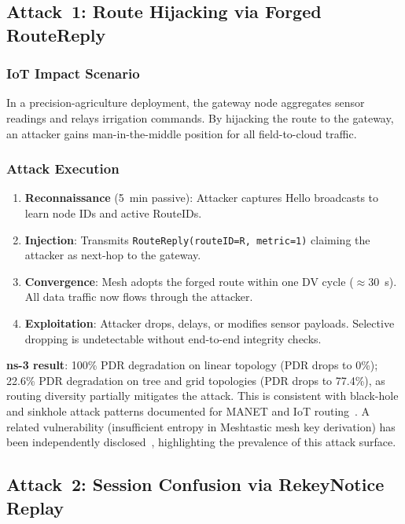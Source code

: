 \documentclass[10pt,journal,compsoc]{IEEEtran}
\begin{document}
\subsection{Attack~1: Route Hijacking via Forged RouteReply}

\subsubsection{IoT Impact Scenario}
In a precision-agriculture deployment, the gateway node aggregates
sensor readings and relays irrigation commands. By hijacking the
route to the gateway, an attacker gains man-in-the-middle
position for all field-to-cloud traffic.

\subsubsection{Attack Execution}
\begin{enumerate}
  \item \textbf{Reconnaissance} (5~min passive): Attacker captures
    Hello broadcasts to learn node IDs and active RouteIDs.
  \item \textbf{Injection}: Transmits
    \texttt{RouteReply(routeID=R, metric=1)} claiming the attacker
    as next-hop to the gateway.
  \item \textbf{Convergence}: Mesh adopts the forged route within
    one DV cycle ($\approx$30~s). All data traffic now flows
    through the attacker.
  \item \textbf{Exploitation}: Attacker drops, delays, or modifies
    sensor payloads. Selective dropping is undetectable without
    end-to-end integrity checks.
\end{enumerate}

\textbf{ns-3 result}: 100\% PDR degradation on linear topology (PDR drops to 0\%);
22.6\% PDR degradation on tree and grid topologies (PDR drops to 77.4\%),
as routing diversity partially mitigates the attack.
This is consistent with black-hole and sinkhole attack patterns
documented for MANET and IoT routing~\cite{sejaphala2025-sinkhole-detection,ieee2025-blackhole-optimization,hu2002-sead}.
A related vulnerability (insufficient entropy in Meshtastic mesh
key derivation) has been independently disclosed~\cite{cve2025-meshtastic-entropy},
highlighting the prevalence of this attack surface.

\subsection{Attack~2: Session Confusion via RekeyNotice Replay}
\end{document}
